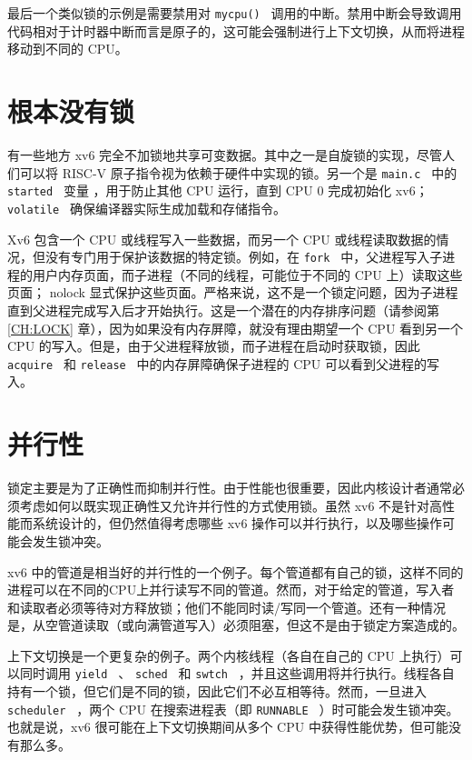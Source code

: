最后一个类似锁的示例是需要禁用对  {    \tt    mycpu()   }         调用的中断。禁用中断会导致调用代码相对于计时器中断而言是原子的，这可能会强制进行上下文切换，从而将进程移动到不同的 CPU。  

   \section{根本没有锁  }     

有一些地方 xv6 完全不加锁地共享可变数据。其中之一是自旋锁的实现，尽管人们可以将 RISC-V 原子指令视为依赖于硬件中实现的锁。另一个是 {    \tt    main.c   } 中的 {    \tt    started   } 变量
     ，用于防止其他 CPU 运行，直到 CPU 0 完成初始化 xv6； {    \tt    volatile   }  确保编译器实际生成加载和存储指令。  

Xv6 包含一个 CPU 或线程写入一些数据，而另一个 CPU 或线程读取数据的情况，但没有专门用于保护该数据的特定锁。例如，在  {    \tt    fork   }  中，父进程写入子进程的用户内存页面，而子进程（不同的线程，可能位于不同的 CPU 上）读取这些页面； nolock 显式保护这些页面。严格来说，这不是一个锁定问题，因为子进程直到父进程完成写入后才开始执行。这是一个潜在的内存排序问题（请参阅第    \ref{CH:LOCK}    章），因为如果没有内存屏障，就没有理由期望一个 CPU 看到另一个 CPU 的写入。但是，由于父进程释放锁，而子进程在启动时获取锁，因此  {    \tt    acquire   }  和  {    \tt    release   }  中的内存屏障确保子进程的 CPU 可以看到父进程的写入。  

   \section{并行性  }     

锁定主要是为了正确性而抑制并行性。由于性能也很重要，因此内核设计者通常必须考虑如何以既实现正确性又允许并行性的方式使用锁。虽然 xv6 不是针对高性能而系统设计的，但仍然值得考虑哪些 xv6 操作可以并行执行，以及哪些操作可能会发生锁冲突。  

xv6 中的管道是相当好的并行性的一个例子。每个管道都有自己的锁，这样不同的进程可以在不同的CPU上并行读写不同的管道。然而，对于给定的管道，写入者和读取者必须等待对方释放锁；他们不能同时读/写同一个管道。还有一种情况是，从空管道读取（或向满管道写入）必须阻塞，但这不是由于锁定方案造成的。  

上下文切换是一个更复杂的例子。两个内核线程（各自在自己的 CPU 上执行）可以同时调用  {    \tt    yield   }  、  {    \tt    sched   }  和  {    \tt    swtch   }  ，并且这些调用将并行执行。线程各自持有一个锁，但它们是不同的锁，因此它们不必互相等待。然而，一旦进入  {    \tt    scheduler   }  ，两个 CPU 在搜索进程表（即  {    \tt    RUNNABLE   }  ）时可能会发生锁冲突。也就是说，xv6 很可能在上下文切换期间从多个 CPU 中获得性能优势，但可能没有那么多。  

